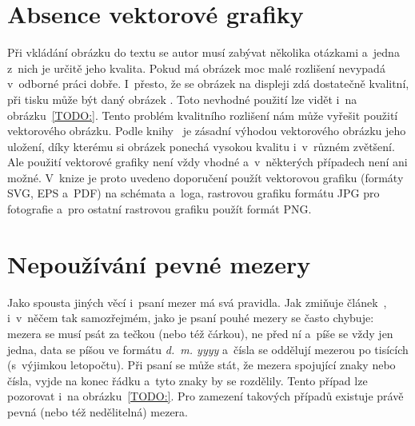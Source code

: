 \section{Absence vektorové grafiky}
Při vkládání obrázku do textu se autor musí zabývat několika otázkami a~jedna
z~nich je určitě jeho kvalita. Pokud má obrázek moc malé rozlišení
nevypadá v~odborné práci dobře. I~přesto, že se obrázek na displeji zdá
dostatečně kvalitní, při tisku může být daný obrázek .
Toto nevhodné použití lze vidět i~na obrázku~\ref{TODO:}.
Tento problém kvalitního rozlišení nám může vyřešit použití vektorového obrázku.
Podle knihy~\cite{Pruvodce_tvorbou_dokumentu} je zásadní výhodou vektorového
obrázku jeho uložení, díky kterému si obrázek ponechá vysokou kvalitu i~v~různém
zvětšení. Ale použití vektorové grafiky není vždy vhodné a~v~některých případech
není ani možné. V~knize je proto uvedeno doporučení použít vektorovou grafiku
(formáty SVG, EPS a~PDF) na schémata a~loga, rastrovou grafiku formátu JPG pro
fotografie a~pro ostatní rastrovou grafiku použít formát PNG.



\section{Nepoužívání pevné mezery}
Jako spousta jiných věcí i~psaní mezer má svá pravidla. Jak zmiňuje
článek~\cite{Ctenar_12_2015}, i~v~něčem tak samozřejmém, jako je psaní pouhé
mezery se často chybuje: mezera se musí psát za tečkou (nebo též čárkou), ne před
ní a~píše se vždy jen jedna, data se píšou ve formátu \emph{d.~m. yyyy}
a~čísla se oddělují mezerou po tisících (s~výjimkou letopočtu). Při psaní se může
stát, že mezera spojující znaky nebo čísla, vyjde na konec řádku a~tyto znaky
by se rozdělily. Tento případ lze pozorovat i~na obrázku~\ref{TODO:}.
Pro zamezení takových případů existuje právě pevná (nebo též nedělitelná)
mezera.


